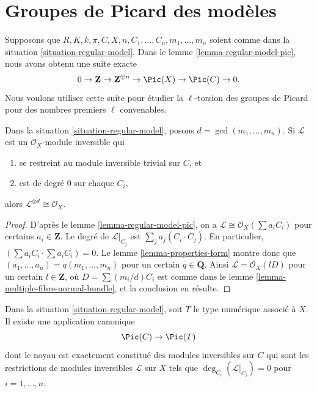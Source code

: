 




\section{Groupes de Picard des modèles}
\label{section-picard-groups-models}

\noindent
Supposons que $R,K,k,\pi,C,X,n,C_1,\ldots,C_n,m_1,\ldots,m_n$ soient comme
dans la situation \ref{situation-regular-model}. Dans le lemme
\ref{lemma-regular-model-pic}, nous avons obtenu une suite exacte
$$
0 \to \mathbf{Z} \to \mathbf{Z}^{\oplus n} \to
\Pic(X) \to \Pic(C) \to 0.
$$
Nous voulons utiliser cette suite pour étudier la $\ell$-torsion des
groupes de Picard pour des nombres premiers $\ell$ convenables.

\begin{lemma}
\label{lemma-characterize-trivial}
Dans la situation \ref{situation-regular-model}, posons
$d=\gcd(m_1,\ldots,m_n)$. Si $\mathcal{L}$ est un
$\mathcal{O}_X$-module inversible qui
\begin{enumerate}
\item se restreint au module inversible trivial sur $C$, et
\item est de degré $0$ sur chaque $C_i$,
\end{enumerate}
alors $\mathcal{L}^{\otimes d} \cong \mathcal{O}_X$.
\end{lemma}

\begin{proof}
D'après le lemme \ref{lemma-regular-model-pic}, on a
$\mathcal{L} \cong \mathcal{O}_X(\sum a_iC_i)$ pour certains
$a_i \in \mathbf{Z}$. Le degré de $\mathcal{L}|_{C_j}$ est
$\sum_j a_j(C_i \cdot C_j)$. En particulier,
$(\sum a_iC_i \cdot \sum a_iC_i)=0$. Le lemme
\ref{lemma-properties-form} montre donc que
$(a_1,\ldots,a_n)=q(m_1,\ldots,m_n)$ pour un certain $q\in\mathbf{Q}$.
Ainsi $\mathcal{L}=\mathcal{O}_X(lD)$ pour un certain
$l\in\mathbf{Z}$, où $D=\sum(m_i/d)C_i$ est comme dans le lemme
\ref{lemma-multiple-fibre-normal-bundle}, et la conclusion en résulte.
\end{proof}

\begin{lemma}
\label{lemma-canonical-map-of-pic}
Dans la situation \ref{situation-regular-model}, soit $T$ le type numérique
associé à $X$. Il existe une application canonique
$$
\Pic(C) \to \Pic(T)
$$
dont le noyau est exactement constitué des modules inversibles sur $C$ qui
sont les restrictions de modules inversibles $\mathcal{L}$ sur $X$ tels
que $\deg_{C_i}(\mathcal{L}|_{C_i})=0$ pour $i=1,\ldots,n$.
\end{lemma}

